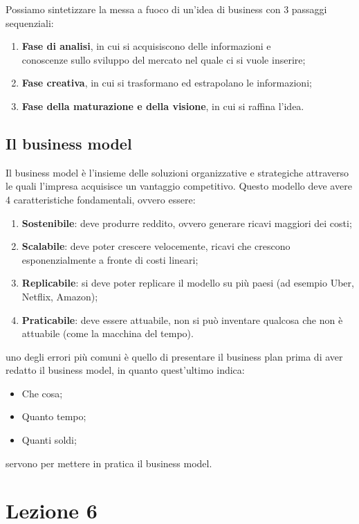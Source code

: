 \documentclass[14pt]{extarticle}
\begin{document}
Possiamo sintetizzare la messa a fuoco di un'idea di business con 3 passaggi
sequenziali:

\begin{enumerate}
    \item \textbf{Fase di analisi}, in cui si acquisiscono delle informazioni e
    \\ conoscenze sullo sviluppo del mercato nel quale ci si vuole inserire;
    \item \textbf{Fase creativa}, in cui si trasformano ed estrapolano le
    informazioni;
    \item \textbf{Fase della maturazione e della visione}, in cui si raffina
    l'idea. 
\end{enumerate}

\subsection{Il business model}

Il business model è l'insieme delle soluzioni organizzative e strategiche
attraverso le quali l'impresa acquisisce un vantaggio competitivo. Questo
modello deve avere 4 caratteristiche fondamentali, ovvero essere:

\begin{enumerate}
    \item \textbf{Sostenibile}: deve produrre reddito, ovvero generare ricavi
    maggiori dei costi;
    \item \textbf{Scalabile}: deve poter crescere velocemente, ricavi che
    crescono esponenzialmente a fronte di costi lineari;
    \item \textbf{Replicabile}: si deve poter replicare il modello su più paesi
    (ad esempio Uber, Netflix, Amazon);
    \item \textbf{Praticabile}: deve essere attuabile, non si può inventare
    qualcosa che non è attuabile (come la macchina del tempo).  
\end{enumerate}
uno degli errori più comuni è quello di presentare il business plan prima di
aver redatto il business model, in quanto quest'ultimo indica:
\begin{itemize}
    \item Che cosa;
    \item Quanto tempo;
    \item Quanti soldi;
\end{itemize}
servono per mettere in pratica il business model.

\newpage
\section{Lezione 6}
\end{document}

